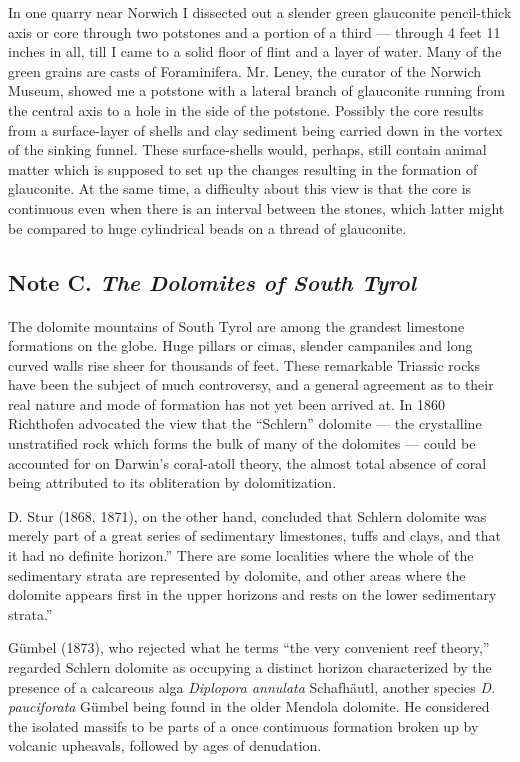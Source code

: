 \documentclass[a4paper, 12pt, oneside]{article}
\begin{document}
In one quarry near Norwich I dissected out a slender green glauconite pencil-thick axis or core through two potstones and a portion of a third --- through 4 feet 11 inches in all, till I came to a solid floor of flint and a layer of water. Many of the green grains are casts of Foraminifera. Mr. Leney, the curator of the Norwich Museum, showed me a potstone with a lateral branch of glauconite running from the central axis to a hole in the side of the potstone. Possibly the core results from a surface-layer of shells and clay sediment being carried down in the vortex of the sinking funnel. These surface-shells would, perhaps, still contain animal matter which is supposed to set up the changes resulting in the formation of glauconite. At the same time, a difficulty about this view is that the core is continuous even when there is an interval between the stones, which latter might be compared to huge cylindrical beads on a thread of glauconite.

\subsection{Note C. \emph{The Dolomites of South Tyrol}}
\paragraph{}
The dolomite mountains of South Tyrol are among the grandest limestone formations on the globe. Huge pillars or cimas, slender campaniles and long curved walls rise sheer for thousands of feet. These remarkable Triassic rocks have been the subject of much controversy, and a general agreement as to their real nature and mode of formation has not yet been arrived at. In 1860 Richthofen advocated the view that the ``Schlern'' dolomite --- the crystalline unstratified rock which forms the bulk of many of the dolomites --- could be accounted for on Darwin's coral-atoll theory, the almost total absence of coral being attributed to its obliteration by dolomitization.

D. Stur (1868, 1871), on the other hand, concluded that Schlern dolomite was merely part of a great series of sedimentary limestones, tuffs and clays, and that it had no definite horizon.'' There are some localities where the whole of the sedimentary strata are represented by dolomite, and other areas where the dolomite appears first in the upper horizons and rests on the lower sedimentary strata.''

Gümbel (1873), who rejected what he terms ``the very convenient reef theory,'' regarded Schlern dolomite as occupying a distinct horizon characterized by the presence of a calcareous alga \emph{Diplopora annulata} Schafhäutl, another species \emph{D. pauciforata} Gümbel being found in the older Mendola dolomite. He considered the isolated massifs to be parts of a once continuous formation broken up by volcanic upheavals, followed by ages of denudation.
\end{document}
